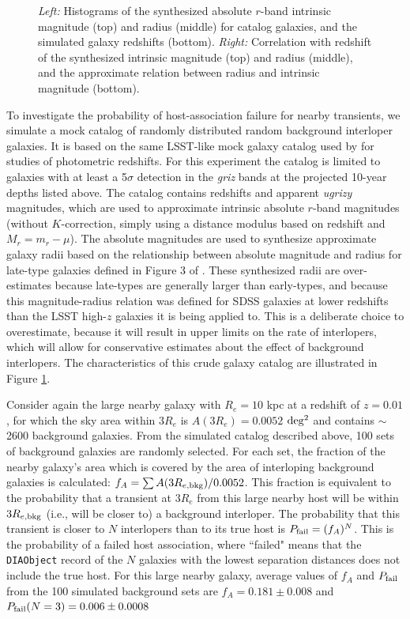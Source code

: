 \documentclass[DM,authoryear,toc]{lsstdoc}
\begin{document}
\begin{figure}[h]
\begin{center}
\caption{{\it Left:} Histograms of the synthesized absolute $r$-band intrinsic magnitude (top) and radius (middle) for catalog galaxies, and the simulated galaxy redshifts (bottom). {\it Right:} Correlation with redshift of the synthesized intrinsic magnitude (top) and radius (middle), and the approximate relation between radius and intrinsic magnitude (bottom).  \label{fig:simcat}}
\end{center}
\end{figure}

To investigate the probability of host-association failure for nearby transients, we simulate a mock catalog of randomly distributed random background interloper galaxies.
It is based on the same LSST-like mock galaxy catalog used by \citet{2018AJ....155....1G} for studies of photometric redshifts.
For this experiment the catalog is limited to galaxies with at least a 5$\sigma$ detection in the {\it griz} bands at the projected 10-year depths listed above.
The catalog contains redshifts and apparent {\it ugrizy} magnitudes, which are used to approximate intrinsic absolute $r$-band magnitudes (without $K$-correction, simply using a distance modulus based on redshift and $M_r=m_r-\mu$).
The absolute magnitudes are used to synthesize approximate galaxy radii based on the relationship between absolute magnitude and radius for late-type galaxies defined in Figure 3 of \citet{2003MNRAS.343..978S}.
These synthesized radii are over-estimates because late-types are generally larger than early-types, and because this magnitude-radius relation was defined for SDSS galaxies at lower redshifts than the LSST high-$z$ galaxies it is being applied to.
This is a deliberate choice to overestimate, because it will result in upper limits on the rate of interlopers, which will allow for conservative estimates about the effect of background interlopers.
The characteristics of this crude galaxy catalog are illustrated in Figure \ref{fig:simcat}.

Consider again the large nearby galaxy with $R_e=10$ kpc at a redshift of $z=0.01$, for which the sky area within $3R_e$ is $A(3R_e)=0.0052$ $\rm deg^2$ and contains $\sim$2600 background galaxies.
From the simulated catalog described above, 100 sets of background galaxies are randomly selected.
For each set, the fraction of the nearby galaxy's area which is covered by the area of interloping background galaxies is calculated: $f_A = \sum{A(3R_{e,{\rm bkg}})} / 0.0052$.
This fraction is equivalent to the probability that a transient at $3R_e$ from this large nearby host will be within $3R_{e,{\rm bkg}}$ (i.e., will be closer to) a background interloper.
The probability that this transient is closer to $N$ interlopers than to its true host is $P_{\rm fail} = (f_A)^N$.
This is the probability of a failed host association, where ``failed" means that the {\tt DIAObject} record of the $N$ galaxies with the lowest separation distances does not include the true host.
For this large nearby galaxy, average values of $f_A$ and $P_{\rm fail}$ from the 100 simulated background sets are $f_A = 0.181\pm0.008$ and $P_{\rm fail} (N=3) = 0.006\pm0.0008$
\end{document}
